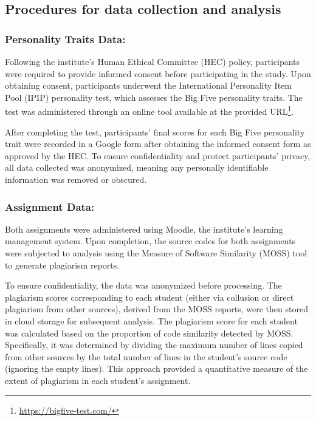 \subsection{Procedures for data collection and analysis}
\subsubsection{Personality Traits Data:} Following the institute's Human Ethical Committee (HEC) policy, participants were required to provide informed consent before participating in the study. Upon obtaining consent, participants underwent the International Personality Item Pool (IPIP) personality test, which assesses the Big Five personality traits. The test was administered through an online tool available at the provided URL\footnote{\url{https://bigfive-test.com/}}.

After completing the test, participants' final scores for each Big Five personality trait were recorded in a Google form after obtaining the informed consent form as approved by the HEC. To ensure confidentiality and protect participants' privacy, all data collected was anonymized, meaning any personally identifiable information was removed or obscured.

\subsubsection{Assignment Data:} 
Both assignments were administered using Moodle, the institute's learning management system. Upon completion, the source codes for both assignments were subjected to analysis using the Measure of Software Similarity (MOSS) tool to generate plagiarism reports.

To ensure confidentiality, the data was anonymized before processing. The plagiarism scores corresponding to each student (either via collusion or direct plagiarism from other sources), derived from the MOSS reports, were then stored in cloud storage for subsequent analysis. The plagiarism score for each student was calculated based on the proportion of code similarity detected by MOSS. Specifically, it was determined by dividing the maximum number of lines copied from other sources by the total number of lines in the student's source code (ignoring the empty lines). This approach provided a quantitative measure of the extent of plagiarism in each student's assignment.